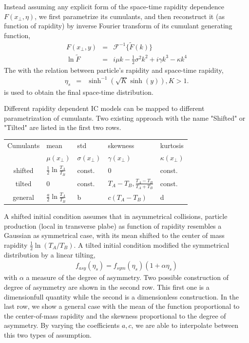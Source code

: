 \documentclass[aps,prl,twocolumn,groupedaddress]{revtex4-1}
\begin{document}
	Instead assuming any explicit form of the space-time rapidity dependence $F(x_\perp, \eta)$, we first parametrize its cumulants, and then reconstruct it (as function of rapidity) by inverse Fourier transform of its cumulant generating function,
	\begin{eqnarray}
	 	F(x_\perp,y) &=& \mathcal{F}^{-1}\{\tilde{F}(k)\} \\
	 	\ln \tilde{F} &=&  i \mu k - \frac{1}{2}\sigma^2 k^2 + i 	\gamma k^3  - \kappa k^4
	\end{eqnarray}
The	with the relation between particle's rapidity and space-time rapidity,
	\begin{eqnarray}
		\eta_s &=& \sinh^{-1}(\sqrt{K}\sinh(y)), K>1. 
	\end{eqnarray}
is used to obtain the final space-time distribution.

	Different rapidity dependent IC models can be mapped to different parametrization of cumulants. Two existing approach with the name "Shifted" or "Tilted" are listed in the first two rows.
	\begin{widetext}
	\begin{center}
	\begin{tabularx}{0.8\textwidth}{c *{4}{Y}}
	\toprule[1pt]
	Cumulants & mean &	std	& skewness	& kurtosis \\
		&	$\mu(x_\perp)$ & $\sigma(x_\perp)$& $\gamma(x_\perp)$  & $\kappa(x_\perp)$	\\
	\midrule[0.5pt]
	shifted & $\frac{1}{2}\ln\frac{T_A}{T_B}$ & const. &  $0$	&const.\\
	tilted & $0$ & const.& $T_A - T_B, \frac{T_A-T_B}{T_A+T_B}$	& const.\\
	general & $\frac{a}{2}\ln\frac{T_A}{T_B}$& b  & $c(T_A - T_B)$ & d \\
	\bottomrule[1pt]
	\end{tabularx}
	\end{center}
	\end{widetext}
	A shifted initial condition assumes that in asymmetrical collisions, particle production (local in transverse plabe) as function of rapidity resembles a Gaussian as symmetrical case, with its mean shifted to the center of mass rapidity $\frac{1}{2}\ln(T_A/T_B)$. A tilted initial condition modified the symmetrical distribution by a linear tilting,
	\begin{eqnarray}
	f_{asy}(\eta_s) = f_{sym}(\eta_s) (1+\alpha \eta_s)
	\end{eqnarray}
	with $\alpha$ a measure of the degree of asymmetry. 
	Two possible construction of degree of asymmetry are shown in the second row. 
	This first one is a dimensionfull quantity while the second is a dimensionless construction. 
	In the last row, we show a general case with the mean of the function proportional to the center-of-mass rapidity and the skewness proportional to the degree of asymmetry. 
	By varying the coefficients $a, c$, we are able to interpolate between this two types of assumption.
	
\end{document}
